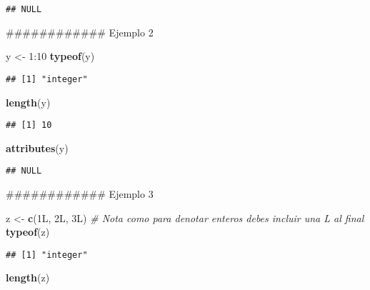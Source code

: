 \documentclass[]{article}
\newenvironment{Shaded}{\begin{snugshade}}{\end{snugshade}}
\newcommand{\KeywordTok}[1]{\textcolor[rgb]{0.13,0.29,0.53}{\textbf{{#1}}}}
\newcommand{\DecValTok}[1]{\textcolor[rgb]{0.00,0.00,0.81}{{#1}}}
\newcommand{\StringTok}[1]{\textcolor[rgb]{0.31,0.60,0.02}{{#1}}}
\newcommand{\CommentTok}[1]{\textcolor[rgb]{0.56,0.35,0.01}{\textit{{#1}}}}
\newcommand{\NormalTok}[1]{{#1}}
\begin{document}
\begin{verbatim}
## NULL
\end{verbatim}

\begin{Shaded}
\begin{Highlighting}[]
\NormalTok{############ Ejemplo 2}

\NormalTok{y <-}\StringTok{ }\DecValTok{1}\NormalTok{:}\DecValTok{10}
\KeywordTok{typeof}\NormalTok{(y)}
\end{Highlighting}
\end{Shaded}

\begin{verbatim}
## [1] "integer"
\end{verbatim}

\begin{Shaded}
\begin{Highlighting}[]
\KeywordTok{length}\NormalTok{(y)}
\end{Highlighting}
\end{Shaded}

\begin{verbatim}
## [1] 10
\end{verbatim}

\begin{Shaded}
\begin{Highlighting}[]
\KeywordTok{attributes}\NormalTok{(y)}
\end{Highlighting}
\end{Shaded}

\begin{verbatim}
## NULL
\end{verbatim}

\begin{Shaded}
\begin{Highlighting}[]
\NormalTok{############ Ejemplo 3}

\NormalTok{z <-}\StringTok{ }\KeywordTok{c}\NormalTok{(1L, 2L, 3L) }\CommentTok{# Nota como para denotar enteros debes incluir una L al final}
\KeywordTok{typeof}\NormalTok{(z)}
\end{Highlighting}
\end{Shaded}

\begin{verbatim}
## [1] "integer"
\end{verbatim}

\begin{Shaded}
\begin{Highlighting}[]
\KeywordTok{length}\NormalTok{(z)}
\end{Highlighting}
\end{Shaded}
\end{document}
